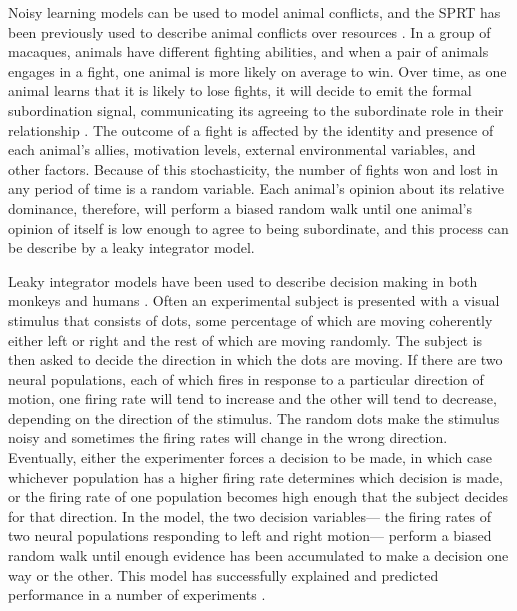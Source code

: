 \documentclass{article}
\begin{document}
Noisy learning models can be used to model animal conflicts, and the SPRT has been previously used to describe animal conflicts over resources \citep{Froment:2010fk}. In a group of macaques, animals have different fighting abilities, and when a pair of animals engages in a fight, one animal is more likely on average to win.  Over time, as one animal learns that it is likely to lose fights, it will decide to emit the formal subordination signal, communicating its agreeing to the subordinate role in their relationship \citep{Flack:2007kx, Flack:2006fk,Flack:2004oq, Waal:1985fk,Caldecott:1986uk}.  The outcome of a fight is affected by the identity and presence of each animal's allies, motivation levels,  external environmental variables, and other factors.  Because of this stochasticity, the number of fights won and lost in any period of time is a random variable.  Each animal's opinion about its relative dominance, therefore, will perform a biased random walk until one animal's opinion of itself is low enough to agree to being subordinate, and this process can be describe by a leaky integrator model.

Leaky integrator models have been used to describe decision making in both monkeys and humans \citep{Eckhoff:2008uq, Brown:2005fk,Feng:2009kl,Bogacz:2006uq}.  Often an experimental subject is presented with a visual stimulus that consists of dots, some percentage of which are moving coherently either left or right and the rest of which are moving randomly.  The subject is then asked to decide the direction in which the dots are moving.  If there are two neural populations, each of which fires in response to a particular direction of motion, one firing rate will tend to increase and the other will tend to decrease, depending on the direction of the stimulus.  The random dots make the stimulus noisy and sometimes the firing rates will change in the wrong direction. Eventually, either the experimenter forces a decision to be made, in which case whichever population has a higher firing rate determines which decision is made, or the firing rate of one population becomes high enough that the subject decides for that direction.  In the model, the two decision variables--- the firing rates of two neural populations responding to left and right motion--- perform a biased random walk until enough evidence has been accumulated to make a decision one way or the other.  This model has successfully explained and predicted performance in a number of experiments \citep{Eckhoff:2008uq, Brown:2005fk,Feng:2009kl,Bogacz:2006uq}.  
\end{document}
